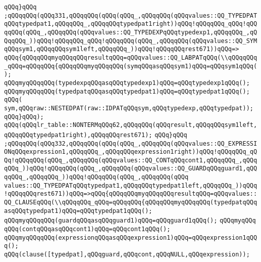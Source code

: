 \verb|qQQq}qQQq|\newline
\verb|;qQQqqQQq(qQQq331,qQQqqQQq(qQQq(qQQq_,qQQqqQQq(qQQqvalues::QQ_TYPEDPATqQQqtypedpat1,qQQqqQQq_,qQQqqQQqtypedpat1right))qQQq!qQQqqQQq_qQQq!qQQqqQQq(qQQq_,qQQqqQQq(qQQqvalues::QQ_TYPEDEXPqQQqtypedexp1,qQQqqQQq_,qQQqqQQq_))qQQq!qQQqqQQq_qQQq!qQQqqQQq(qQQq_,qQQqqQQq(qQQqvalues::QQ_SYMqQQqsym1,qQQqqQQqsym1left,qQQqqQQq_))qQQq!qQQqqQQqrest671))qQQq=>|\newline
\verb|qQQq{qQQqqQQqmyqQQqqQQqresultqQQq=qQQqvalues::QQ_LABPATqQQq(\\qQQqqQQq_qQQq=qQQqqQQq{qQQqqQQqmyqQQqqQQq(symqQQqasqQQqsym1)qQQq=qQQqsym1qQQq();|\newline
\verb|qQQqmyqQQqqQQq(typedexpqQQqasqQQqtypedexp1)qQQq=qQQqtypedexp1qQQq();|\newline
\verb|qQQqmyqQQqqQQq(typedpatqQQqasqQQqtypedpat1)qQQq=qQQqtypedpat1qQQq();|\newline
\verb|qQQq(|\newline
\verb|sym,qQQqraw::NESTEDPAT(raw::IDPATqQQqsym,qQQqtypedexp,qQQqtypedpat));|\newline
\verb|qQQq}qQQq);|\newline
\verb|qQQq(qQQqlr_table::NONTERMqQQq62,qQQqqQQq(qQQqresult,qQQqqQQqsym1left,qQQqqQQqtypedpat1right),qQQqqQQqrest671);|\newline
\verb|qQQq}qQQq|\newline
\verb|;qQQqqQQq(qQQq332,qQQqqQQq(qQQq(qQQq_,qQQqqQQq(qQQqvalues::QQ_EXPRESSIONqQQqexpression1,qQQqqQQq_,qQQqqQQqexpression1right))qQQq!qQQqqQQq_qQQq!qQQqqQQq(qQQq_,qQQqqQQq(qQQqvalues::QQ_CONTqQQqcont1,qQQqqQQq_,qQQqqQQq_))qQQq!qQQqqQQq(qQQq_,qQQqqQQq(qQQqvalues::QQ_GUARDqQQqguard1,qQQqqQQq_,qQQqqQQq_))qQQq!qQQqqQQq(qQQq_,qQQqqQQq(qQQq|\newline
\verb|values::QQ_TYPEDPATqQQqtypedpat1,qQQqqQQqtypedpat1left,qQQqqQQq_))qQQq!qQQqqQQqrest671))qQQq=>qQQq{qQQqqQQqmyqQQqqQQqresultqQQq=qQQqvalues::QQ_CLAUSEqQQq(\\qQQqqQQq_qQQq=qQQqqQQq{qQQqqQQqmyqQQqqQQq(typedpatqQQqasqQQqtypedpat1)qQQq=qQQqtypedpat1qQQq();|\newline
\verb|qQQqmyqQQqqQQq(guardqQQqasqQQqguard1)qQQq=qQQqguard1qQQq();|\newline
\verb|qQQqmyqQQq|\newline
\verb|qQQq(contqQQqasqQQqcont1)qQQq=qQQqcont1qQQq();|\newline
\verb|qQQqmyqQQqqQQq(expressionqQQqasqQQqexpression1)qQQq=qQQqexpression1qQQq();|\newline
\verb|qQQq(clause([typedpat],qQQqguard,qQQqcont,qQQqNULL,qQQqexpression));|\newline
